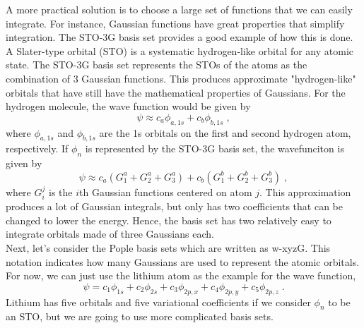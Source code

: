 \documentclass[12pt]{report}
\begin{document}
A more practical solution is to choose a large set of functions that we can
easily integrate. For instance, Gaussian functions have great properties that
simplify integration. The STO-3G basis set provides a good example of how this
is done. A Slater-type orbital (STO) is a systematic hydrogen-like orbital for
any atomic state. The STO-3G basis set represents the STOs of the atoms as the
combination of 3 Gaussian functions. This produces approximate "hydrogen-like"
orbitals that have still have the mathematical properties of Gaussians. For
the hydrogen molecule, the wave function would be given by
\begin{equation}
 \psi \approx c_a\phi_{a,1s}+c_b\phi_{b,1s} \; ,
\end{equation}
where $\phi_{a,1s}$ and $\phi_{b,1s}$ are the 1s orbitals on the first and
second hydrogen atom, respectively. If $\phi_n$ is represented by the STO-3G
basis set, the wavefunciton is given by
\begin{equation}
 \psi \approx c_a(G^a_1+G^a_2+G^a_3)+c_b(G^b_1+G^b_2+G^b_3) \; ,
\end{equation}
where $G^j_i$ is the $i$th Gaussian functions centered on atom $j$. This
approximation produces a lot of Gaussian integrals, but only has two
coefficients that can be changed to lower the energy. Hence, the basis set has
two relatively easy to integrate orbitals made of three Gaussians each. \\

Next, let's consider the Pople basis sets which are written as w-xyzG. This
notation indicates how many Gaussians are used to represent the atomic
orbitals. For now, we can just use the lithium atom as the example for the
wave function,
\begin{equation}
 \psi = c_1\phi_{1s} + c_2\phi_{2s} + c_3\phi_{2p,x} +
 c_4\phi_{2p,y} + c_5\phi_{2p,z} \; .
\end{equation}
Lithium has five orbitals and five variational coefficients if we consider
$\phi_n$ to be an STO, but we are going to use more complicated basis sets. \\
\end{document}
